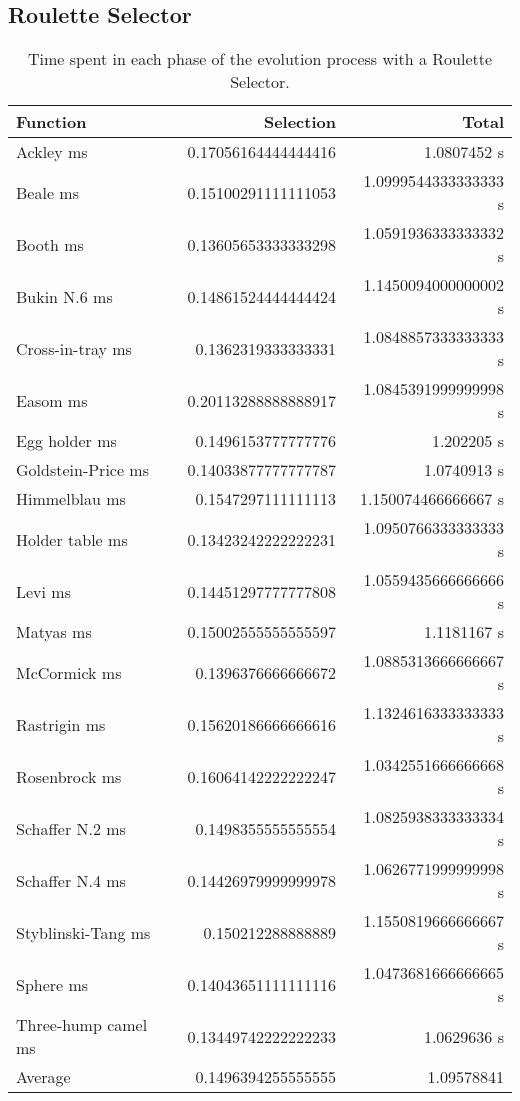   \subsection{Roulette Selector}
    \begin{table}[H]
      \centering
      \begin{tabular}{|l|r|r|}
        \hline
        Function  & Selection & Total \\
        \hline\hline
        Ackley ms	& 0.17056164444444416	& 1.0807452 s\\\hline
        Beale ms	& 0.15100291111111053	& 1.0999544333333333 s\\\hline
        Booth ms	& 0.13605653333333298	& 1.0591936333333332 s\\\hline
        Bukin N.6 ms	& 0.14861524444444424	& 1.1450094000000002 s\\\hline
        Cross-in-tray ms	& 0.1362319333333331	& 1.0848857333333333 s\\\hline
        Easom ms	& 0.20113288888888917	& 1.0845391999999998 s\\\hline
        Egg holder ms	& 0.1496153777777776	& 1.202205 s\\\hline
        Goldstein-Price ms	& 0.14033877777777787	& 1.0740913 s\\\hline
        Himmelblau ms	& 0.1547297111111113	& 1.150074466666667 s\\\hline
        Holder table ms	& 0.13423242222222231	& 1.0950766333333333 s\\\hline
        Levi ms	& 0.14451297777777808	& 1.0559435666666666 s\\\hline
        Matyas ms	& 0.15002555555555597	& 1.1181167 s\\\hline
        McCormick ms	& 0.1396376666666672	& 1.0885313666666667 s\\\hline
        Rastrigin ms	& 0.15620186666666616	& 1.1324616333333333 s\\\hline
        Rosenbrock ms	& 0.16064142222222247	& 1.0342551666666668 s\\\hline
        Schaffer N.2 ms	& 0.1498355555555554	& 1.0825938333333334 s\\\hline
        Schaffer N.4 ms	& 0.14426979999999978	& 1.0626771999999998 s\\\hline
        Styblinski-Tang ms	& 0.150212288888889	& 1.1550819666666667 s\\\hline
        Sphere ms	& 0.14043651111111116	& 1.0473681666666665 s\\\hline
        Three-hump camel ms	& 0.13449742222222233	& 1.0629636 s\\\hline
       \hline Average	& 0.1496394255555555	& 1.09578841 \\\hline
      \end{tabular}
      \caption{
        Time spent in each phase of the evolution process with a Roulette Selector.
      }
      \label{tab:fn_opt:results:time}
    \end{table}

